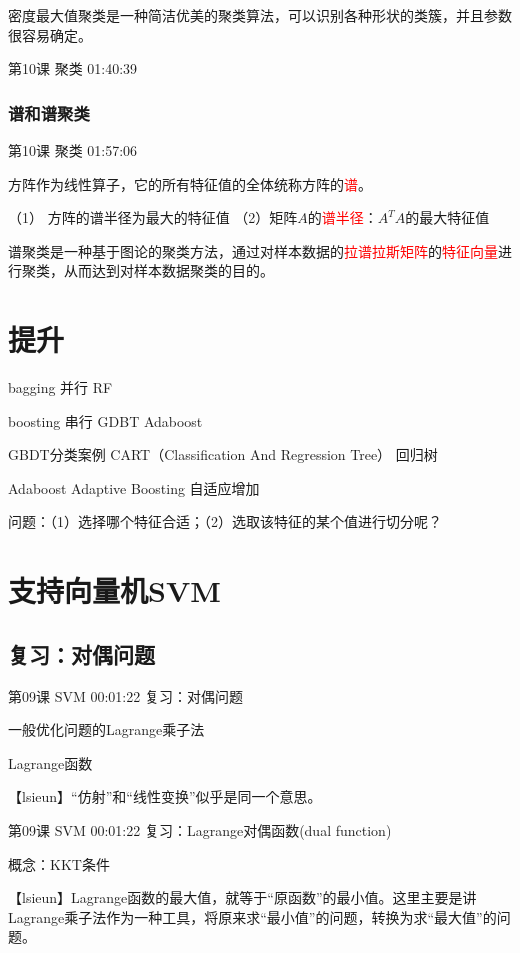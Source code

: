 \documentclass[UTF8]{ctexart}
\begin{document}
密度最大值聚类是一种简洁优美的聚类算法，可以识别各种形状的类簇，并且参数很容易确定。

第10课 聚类 01:40:39

\subsubsection{谱和谱聚类}

第10课 聚类 01:57:06

方阵作为线性算子，它的所有特征值的全体统称方阵的\textcolor{red}{谱}。

（1） 方阵的谱半径为最大的特征值
（2）矩阵$A$的\textcolor{red}{谱半径}：$A^{T}A$的最大特征值

谱聚类是一种基于图论的聚类方法，通过对样本数据的\textcolor{red}{拉谱拉斯矩阵}的\textcolor{red}{特征向量}进行聚类，从而达到对样本数据聚类的目的。

\section{提升}

bagging 并行 RF

boosting 串行 GDBT Adaboost

GBDT分类案例   CART（Classification And Regression Tree） 回归树


Adaboost Adaptive Boosting 自适应增加

问题：（1）选择哪个特征合适；（2）选取该特征的某个值进行切分呢？





\section{支持向量机SVM}

\subsection{复习：对偶问题}


第09课 SVM 00:01:22 复习：对偶问题

一般优化问题的Lagrange乘子法

Lagrange函数

【lsieun】“仿射”和“线性变换”似乎是同一个意思。

第09课 SVM 00:01:22 复习：Lagrange对偶函数(dual function)

概念：KKT条件

【lsieun】Lagrange函数的最大值，就等于“原函数”的最小值。这里主要是讲Lagrange乘子法作为一种工具，将原来求“最小值”的问题，转换为求“最大值”的问题。
\end{document}
